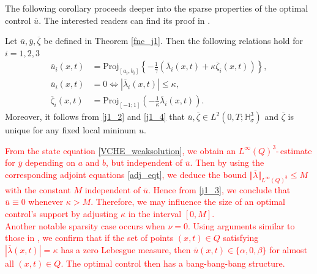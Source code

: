 \documentclass[reqno]{amsart}
\begin{document}
	The following corollary proceeds deeper into the sparse properties of the optimal control $\overline{u}$. The interested readers can find its proof in \cite{CHW2012}.
	\begin{corollary}
		Let $\overline{u}, \overline{y},\overline{\zeta}$ be defined in Theorem \ref{fnc_j1}. Then the following relations hold for $i=1,2,3$
		\begin{align}
			\overline{u}_i(x,t) &= \text{Proj}_{[a_i,b_i]}\left\{ -\frac{1}{\gamma} \left( \overline{\lambda}_i(x,t) + \kappa \overline{\zeta}_i(x,t) \right)\right\} \label{j1_2},\\
			\overline{u}_i(x,t) &=0 \Leftrightarrow \left| \overline{\lambda}_i(x,t) \right| \leq \kappa \label{j1_3}, \\
			\overline{\zeta}_i(x,t) &= \text{Proj}_{[-1;1]} \left( -\frac{1}{\kappa} \overline{\lambda}_i(x,t) \right). \label{j1_4}
		\end{align}
		Moreover, it follows from \eqref{j1_2} and \eqref{j1_4} that $\overline{u},\overline{\zeta} \in L^2(0,T;\mathbb{H}^3_\sigma)$
		and $\overline{\zeta}$ is unique for any fixed local mininum $u$.
	\end{corollary}
	\textcolor{red}{
		\begin{remark}
			{\rm From the state equation \eqref{VCHE_weaksolution}, we obtain an $L^\infty(Q)^3 $-\,estimate for $\overline{y}$ depending on $a$ and $b$, but independent of $\overline{u}$. Then by using the corresponding adjoint equations \eqref{adj_eqt}, we deduce the bound $\Vert \overline{\lambda} \Vert_{L^\infty(Q)^3} \leq M$ with the constant $M$ independent of $\overline{u}$. Hence from \eqref{j1_3}, we conclude that $\overline{u} \equiv 0 $ whenever $\kappa>M$. Therefore, we may influence the size of an optimal control's support by adjusting $\kappa$ in the interval $[0,M]$. \\
				Another notable sparsity case occurs when $\nu=0$. Using arguments similar to those in \cite{AGS2025}, we confirm that if the set of points $(x,t)\in Q$ satisfying $\left| \overline{\lambda}(x,t) \right| = \kappa$ has a zero Lebesgue measure, then $\overline{u}(x,t)\in \{\alpha, 0,\beta\}$ for almost all $(x,t)\in Q$. The optimal control then has a bang-bang-bang structure.
			}
	\end{remark} }
	
\end{document}
